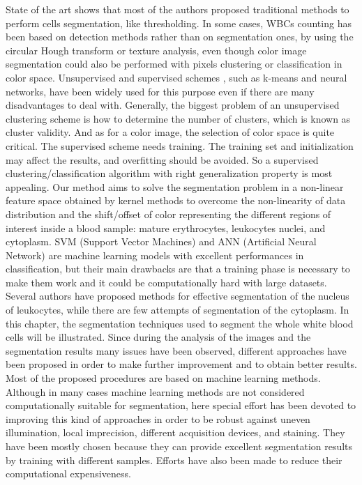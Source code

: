 \documentclass[final,a4paper,12pt,english]{UnicaPhdThesis3}
\begin{document}
{State of the art shows that most of the authors proposed traditional methods to perform cells segmentation, like thresholding. In some cases, WBCs counting has been based on detection methods rather than on segmentation ones, by using the circular Hough transform \cite{Mahmood} or texture analysis, even though color image segmentation could also be performed with pixels clustering or classification in color space. Unsupervised and supervised schemes \cite{Pan}, such as k-means and neural networks, have been widely used for this purpose even if there are many disadvantages to deal with. Generally, the biggest problem of an unsupervised clustering scheme is how to determine the number of clusters, which is known as cluster validity. And as for a color image, the selection of color space is quite critical. The supervised scheme needs training. The training set and initialization may affect the results, and overfitting should be avoided. So a supervised clustering/classification algorithm with right generalization property is most appealing. Our method aims to solve the segmentation problem in a non-linear feature space obtained by kernel methods to overcome the non-linearity of data distribution and the shift/offset of color representing the different regions of interest inside a blood sample: mature erythrocytes, leukocytes nuclei, and cytoplasm. SVM (Support Vector Machines) and ANN (Artificial Neural Network) are machine learning models with excellent performances in classification, but their main drawbacks are that a training phase is necessary to make them work and it could be computationally hard with large datasets.
Several authors have proposed methods for effective segmentation of the nucleus of leukocytes, while there are few attempts of segmentation of the cytoplasm. In this chapter, the segmentation techniques used to segment the whole white blood cells will be illustrated. Since during the analysis of the images and the segmentation results many issues have been observed, different approaches have been proposed in order to make further improvement and to obtain better results. Most of the proposed procedures are based on machine learning methods. Although in many cases machine learning methods are not considered computationally suitable for segmentation, here special effort has been devoted to improving this kind of approaches in order to be robust against uneven illumination, local imprecision, different acquisition devices, and staining. They have been mostly chosen because they can provide excellent segmentation results by training with different samples. Efforts have also been made to reduce their computational expensiveness.

}
\end{document}
